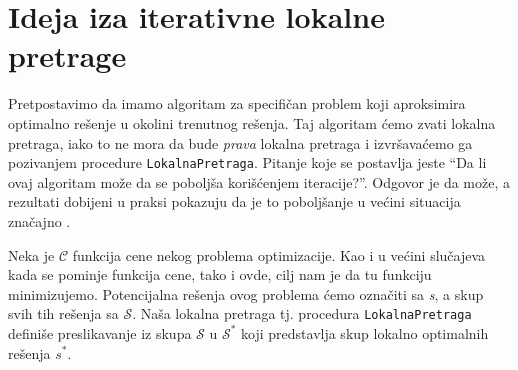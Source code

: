 \documentclass[a4paper]{article}
\newcommand{\q}[1]{``#1''}  %
\newcommand{\s}[0]{\textit{s}} %
\newcommand{\sstar}[0]{$\textit{s}^*$}
\renewcommand{\S}[0]{$\mathcal{S}$} %
\newcommand{\Sstar}[0]{$\mathcal{S}^{*}$}
\newcommand{\lokalna}[0]{\small{\texttt{LokalnaPretraga}}}
\begin{document}

\section{Ideja iza iterativne lokalne pretrage}
Pretpostavimo da imamo algoritam za specifičan problem koji aproksimira optimalno rešenje u okolini trenutnog rešenja. 
Taj algoritam ćemo zvati lokalna pretraga, iako to ne mora da bude \textit{prava} lokalna pretraga i  
izvršavaćemo ga pozivanjem procedure \lokalna{}. Pitanje koje se postavlja jeste \q{Da li 
ovaj algoritam može da se poboljša korišćenjem iteracije?}. Odgovor je da može, a rezultati dobijeni u praksi pokazuju 
da je to poboljšanje u većini situacija značajno \cite{beginnersIntroduction}.\footnotemark
{} 

Neka je $\mathcal{C}$ funkcija cene nekog problema optimizacije. Kao i u većini slučajeva kada se pominje funkcija cene,
tako i ovde, cilj nam je da tu funkciju minimizujemo. Potencijalna rešenja ovog problema ćemo označiti sa \s{}, 
a skup svih tih rešenja sa \S{}. Naša lokalna pretraga tj. procedura \lokalna{} definiše preslikavanje 
iz skupa \S{} u \Sstar{} koji predstavlja skup lokalno optimalnih rešenja \sstar{}.
\end{document}
